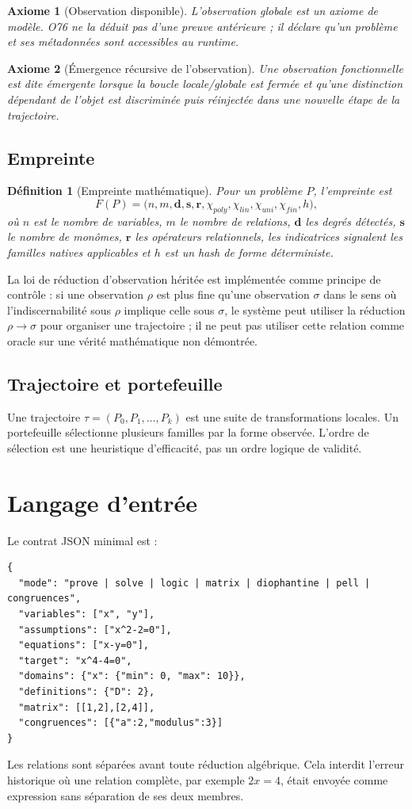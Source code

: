 \documentclass[11pt,a4paper]{article}
\newtheorem{definition}{Définition}[section]
\newtheorem{axiom}{Axiome}[section]
\begin{document}
\begin{axiom}[Observation disponible]
L'observation globale est un axiome de modèle. O76 ne la déduit pas d'une preuve antérieure ; il déclare qu'un problème et ses métadonnées sont accessibles au runtime.
\end{axiom}

\begin{axiom}[Émergence récursive de l'observation]
Une observation fonctionnelle est dite émergente lorsque la boucle locale/globale est fermée et qu'une distinction dépendant de l'objet est discriminée puis réinjectée dans une nouvelle étape de la trajectoire.
\end{axiom}

\subsection{Empreinte}
\begin{definition}[Empreinte mathématique]
Pour un problème $P$, l'empreinte est
\[
F(P)=\bigl(n,m,\mathbf d,\mathbf s,\mathbf r,\chi_{poly},\chi_{lin},\chi_{uni},\chi_{fin},h\bigr),
\]
où $n$ est le nombre de variables, $m$ le nombre de relations, $\mathbf d$ les degrés détectés, $\mathbf s$ le nombre de monômes, $\mathbf r$ les opérateurs relationnels, les indicatrices signalent les familles natives applicables et $h$ est un hash de forme déterministe.
\end{definition}

La loi de réduction d'observation héritée est implémentée comme principe de contrôle : si une observation $\rho$ est plus fine qu'une observation $\sigma$ dans le sens où l'indiscernabilité sous $\rho$ implique celle sous $\sigma$, le système peut utiliser la réduction $\rho\to\sigma$ pour organiser une trajectoire ; il ne peut pas utiliser cette relation comme oracle sur une vérité mathématique non démontrée.

\subsection{Trajectoire et portefeuille}
Une trajectoire $\tau=(P_0,P_1,\ldots,P_k)$ est une suite de transformations locales. Un portefeuille sélectionne plusieurs familles par la forme observée. L'ordre de sélection est une heuristique d'efficacité, pas un ordre logique de validité.

\section{Langage d'entrée}
Le contrat JSON minimal est :
\begin{verbatim}
{
  "mode": "prove | solve | logic | matrix | diophantine | pell | congruences",
  "variables": ["x", "y"],
  "assumptions": ["x^2-2=0"],
  "equations": ["x-y=0"],
  "target": "x^4-4=0",
  "domains": {"x": {"min": 0, "max": 10}},
  "definitions": {"D": 2},
  "matrix": [[1,2],[2,4]],
  "congruences": [{"a":2,"modulus":3}]
}
\end{verbatim}
Les relations sont séparées avant toute réduction algébrique. Cela interdit l'erreur historique où une relation complète, par exemple $2x=4$, était envoyée comme expression sans séparation de ses deux membres.
\end{document}
